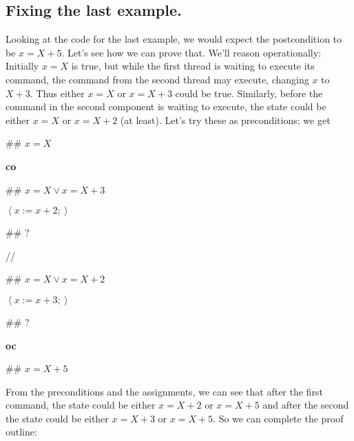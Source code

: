 \documentclass[11pt]{article}%
\begin{document}
\subsection{Fixing the last example.}

Looking at the code for the last example, we would expect the postcondition to
be $x=X+5$. Let's see how we can prove that. We'll reason operationally:
Initially $x=X$ is true, but while the first thread is waiting to execute its
command, the command from the second thread may execute, changing $x$ to
$X+3$. Thus either $x=X$ or $x=X+3$ could be true. Similarly, before the
command in the second component is waiting to execute, the state could be
either $x=X$ or $x=X+2$ (at least). Let's try these as preconditions; we get

\begin{code}
\#\# $x=X$

\textbf{co}

\begin{indent}
\item \#\# $x=X\vee x=X+3$

\item $\left\langle x:=x+2;\right\rangle $

\item \#\# $?$
\end{indent}

//

\begin{indent}
\item \#\# $x=X\vee x=X+2$

\item $\left\langle x:=x+3;\right\rangle $

\item \#\# $?$
\end{indent}

\textbf{oc}

\#\# $x=X+5$
\end{code}

From the preconditions and the assignments, we can see that after the first
command, the state could be either $x=X+2$ or $x=X+5$ and after the second the
state could be either $x=X+3$ or $x=X+5$. So we can complete the proof outline:
\end{document}
